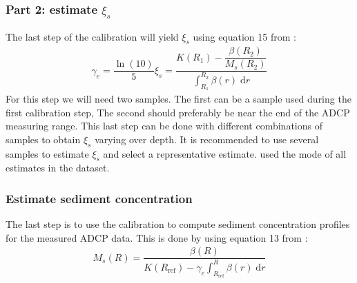 \documentclass[]{article}
\begin{document}
\subsubsection{Part 2: estimate $\xi_s$}
The last step of the calibration will yield $\xi_s$ using equation 15 from \citet{sassi2012}:
\begin{align}
  \gamma_e=\dfrac{\ln(10)}{5}\xi_s=\dfrac{K(R_1)-\dfrac{\beta(R_2)}{M_s(R_2)}}{\int_{R_1}^{R_2}\beta(r)\;\text{d}r}
\end{align}
For this step we will need two samples. The first can be a sample used during the first calibration step, The second should preferably be near the end of the ADCP measuring range. This last step can be done with different combinations of samples to obtain $\xi_s$ varying over depth. It is recommended to use several samples to estimate $\xi_s$ and select a representative estimate. \citet{sassi2012} used the mode of all estimates in the dataset.


\subsubsection{Estimate sediment concentration}
The last step is to use the calibration to compute sediment concentration profiles for the measured ADCP data.
This is done by using equation 13 from \citet{sassi2012}:
\begin{align}
  M_s(R)=\dfrac{\beta(R)}{K(R_\text{ref})-\gamma_e\int_{R_\text{ref}}^R\beta(r)\;\text{d}r}
\end{align}
\end{document}
